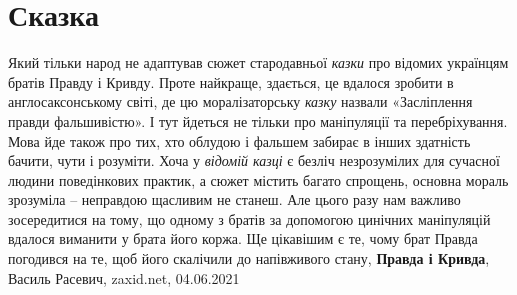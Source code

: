  
 
 
 
 
\chapter{Сказка}

Який тільки народ не адаптував сюжет стародавньої \emph{казки} про відомих
українцям братів Правду і Кривду. Проте найкраще, здається, це вдалося зробити
в англосаксонському світі, де цю моралізаторську \emph{казку} назвали
«Засліплення правди фальшивістю». І тут йдеться не тільки про маніпуляції та
перебріхування.  Мова йде також про тих, хто облудою і фальшем забирає в інших
здатність бачити, чути і розуміти. Хоча у \emph{відомій казці} є безліч
незрозумілих для сучасної людини поведінкових практик, а сюжет містить багато
спрощень, основна мораль зрозуміла – неправдою щасливим не станеш. Але цього
разу нам важливо зосередитися на тому, що одному з братів за допомогою цинічних
маніпуляцій вдалося виманити у брата його коржа. Ще цікавішим є те, чому брат
Правда погодився на те, щоб його скалічили до напівживого стану,
\textbf{Правда і Кривда}, Василь Расевич, zaxid.net, 04.06.2021

